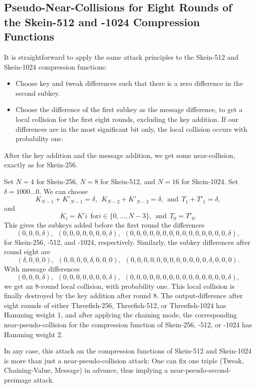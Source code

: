 \documentclass[11pt,twoside]{article}
\begin{document}
\subsection{Pseudo-Near-Collisions for Eight Rounds of the Skein-512 and 
-1024 Compression Functions}

It is straightforward to apply the same attack principles to the Skein-512 and Skein-1024 compression functions:
\begin{itemize}
\item Choose key and tweak differences such that there is a zero 
  difference in the second subkey.
\item Choose the difference of the first subkey as the message difference, 
  to get a local collision for the first eight rounds, excluding the key 
  addition. If our differences are in the most significant bit only, the 
  local collision occurs with probability one.
\end{itemize}
After the key addition and the message addition, we get some near-collision, exactly as for Skein-256.

Set $N=4$ for Skein-256, $N=8$ for Skein-512, and $N=16$ for Skein-1024. Set $\delta=1000\ldots0$. We can choose  
 \[ K_{N-1} + K'_{N-1}   = \delta, \ \ K_{N-2} + K'_{N-2} = \delta,
    \ \ \mbox{and} \ \  T_1 + T'_1 = \delta, 
 \]
and
 \[ K_i=K'i \ \ \mbox{for} i \in \{0, \ldots, N-3\}, \ \ \mbox{and} \ \ 
    T_0 = T'_0. 
 \] 
This gives the subkeys added before the first round the differences 
  \[ (0, 0, 0, \delta), \ \ (0, 0, 0, 0, 0, 0, 0, \delta), \ \
     (0,0,0,0,0,0,0,0,0,0,0,0,0, 0, 0, \delta),
  \]
for Skein-256, -512, and -1024, respectively. Similarly, the subkey 
differences after round eight are 
  \[ (\delta, 0, 0, 0), \ \ (0, 0, 0, 0, \delta, 0, 0, 0), \ \
     (0,0,0,0,0,0,0,0,0,0,0,0, \delta, 0, 0, 0).
  \]
With message differences 
  \[ (0, 0, 0, \delta), \ \ (0, 0, 0, 0, 0, 0, 0, \delta), \ \
     (0,0,0,0,0,0,0,0,0,0,0,0,0, 0, 0, \delta),
  \]
we get an 8-round local collision, with probability one. This local collision is finally destroyed by the key addition after round 8. The output-difference after eight rounds of either Threefish-256, Threefish-512, or Threefish-1024 has Hamming weight 1, and after applying the chaining mode, the corresponding near-pseudo-collision for the compression function of Skein-256, -512, or -1024 has Hamming weight 2.

In any case, this attack on the compression functions of Skein-512 and Skein-1024 is more than just a near-pseudo-collision attack: One can fix one triple (Tweak, Chaining-Value, Message) in advance, thus implying a near-pseudo-second-preimage attack.
\end{document}
